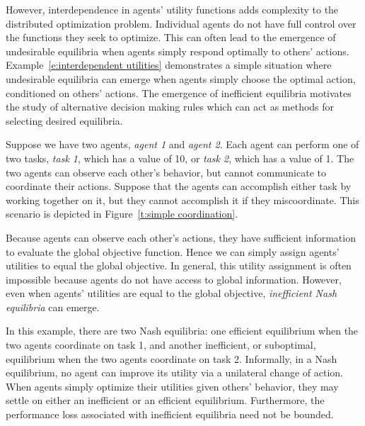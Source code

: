 However, interdependence in agents' utility functions adds complexity to the distributed optimization problem. Individual agents do not have full control over the functions they seek to optimize. This can often lead to the emergence of undesirable equilibria when agents simply respond optimally to others' actions. Example~\ref{e:interdependent utilities} demonstrates a simple situation where undesirable equilibria can emerge when agents simply choose the optimal action, conditioned on others' actions. The emergence of inefficient equilibria motivates the study of alternative decision making rules which can act as methods for selecting desired equilibria.

\begin{example}\label{e:interdependent utilities}
Suppose we have two agents, {\it agent 1} and {\it agent 2}. Each agent can perform one of two tasks, {\it task 1}, which has a value of 10, or {\it task 2}, which has a value of 1.  The two agents can observe each other's behavior, but cannot communicate to coordinate their actions. Suppose that the agents can accomplish either task by working together on it, but they cannot accomplish it if they miscoordinate. This scenario is depicted in Figure~\ref{t:simple coordination}.

Because agents can observe each other's actions, they have sufficient information to evaluate the global objective function. Hence we can simply assign agents' utilities to equal the global objective. In general, this utility assignment is often impossible because agents do not have access to global information. However, even when agents' utilities are equal to the global objective, {\it inefficient Nash equilibria} can emerge.

In this example, there are two Nash equilibria: one efficient equilibrium when the two agents coordinate on task 1, and another inefficient, or suboptimal, equilibrium when the two agents coordinate on task 2. Informally, in a Nash equilibrium, no agent can improve its utility via a unilateral change of action. When agents simply optimize their utilities given others' behavior, they may settle on either an inefficient or an efficient equilibrium. Furthermore, the performance loss associated with inefficient equilibria need not be bounded.




\end{example}
